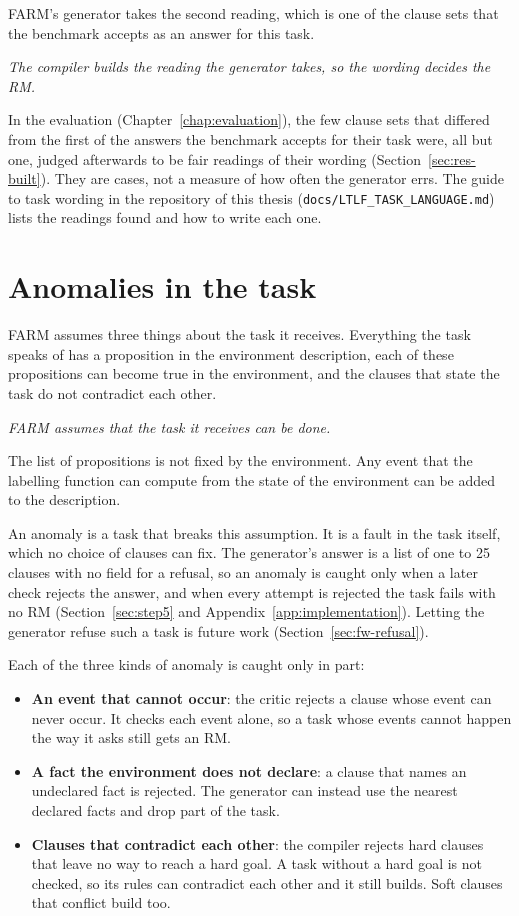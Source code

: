 \documentclass[11pt,english,listoffigures,listoftables]{tfgetsinf}
\newcommand{\keyidea}[1]{\par\smallskip\noindent\hspace*{0.6em}{\color{gray!55}\vrule width 1.5pt}\hspace{8pt}\parbox[t]{\dimexpr\linewidth-0.6em-9.5pt\relax}{\itshape #1}\par\smallskip}  %
\begin{document}
\noindent FARM's generator takes the second reading, which is one of the clause sets that the benchmark accepts as an answer for this task.

\keyidea{The compiler builds the reading the generator takes, so the wording decides the RM.}
\noindent In the evaluation (Chapter~\ref{chap:evaluation}), the few clause sets that differed from the first of the answers the benchmark accepts for their task were, all but one, judged afterwards to be fair readings of their wording (Section~\ref{sec:res-built}). They are cases, not a measure of how often the generator errs. The guide to task wording in the repository of this thesis (\texttt{docs/LTLF\_TASK\_LANGUAGE.md}) lists the readings found and how to write each one.

\section{Anomalies in the task}
\label{sec:lim-anomalies}
FARM assumes three things about the task it receives. Everything the task speaks of has a proposition in the environment description, each of these propositions can become true in the environment, and the clauses that state the task do not contradict each other.

\keyidea{FARM assumes that the task it receives can be done.}

The list of propositions is not fixed by the environment. Any event that the labelling function can compute from the state of the environment can be added to the description.

An anomaly is a task that breaks this assumption. It is a fault in the task itself, which no choice of clauses can fix. The generator's answer is a list of one to 25 clauses with no field for a refusal, so an anomaly is caught only when a later check rejects the answer, and when every attempt is rejected the task fails with no RM (Section~\ref{sec:step5} and Appendix~\ref{app:implementation}). Letting the generator refuse such a task is future work (Section~\ref{sec:fw-refusal}).

Each of the three kinds of anomaly is caught only in part:
\begin{itemize}
    \item \textbf{An event that cannot occur}: the critic rejects a clause whose event can never occur. It checks each event alone, so a task whose events cannot happen the way it asks still gets an RM.
    \item \textbf{A fact the environment does not declare}: a clause that names an undeclared fact is rejected. The generator can instead use the nearest declared facts and drop part of the task.
    \item \textbf{Clauses that contradict each other}: the compiler rejects hard clauses that leave no way to reach a hard goal. A task without a hard goal is not checked, so its rules can contradict each other and it still builds. Soft clauses that conflict build too.
\end{itemize}
\end{document}
